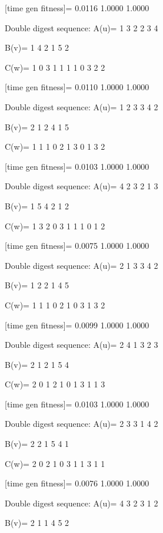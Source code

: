 [time gen fitness]=
    0.0116    1.0000    1.0000

Double digest sequence:
A(u)=
     1     3     2     2     3     4

B(v)=
     1     4     2     1     5     2

C(w)=
     1     0     3     1     1     1     1     0     3     2     2

[time gen fitness]=
    0.0110    1.0000    1.0000

Double digest sequence:
A(u)=
     1     2     3     3     4     2

B(v)=
     2     1     2     4     1     5

C(w)=
     1     1     1     0     2     1     3     0     1     3     2

[time gen fitness]=
    0.0103    1.0000    1.0000

Double digest sequence:
A(u)=
     4     2     3     2     1     3

B(v)=
     1     5     4     2     1     2

C(w)=
     1     3     2     0     3     1     1     1     0     1     2

[time gen fitness]=
    0.0075    1.0000    1.0000

Double digest sequence:
A(u)=
     2     1     3     3     4     2

B(v)=
     1     2     2     1     4     5

C(w)=
     1     1     1     0     2     1     0     3     1     3     2

[time gen fitness]=
    0.0099    1.0000    1.0000

Double digest sequence:
A(u)=
     2     4     1     3     2     3

B(v)=
     2     1     2     1     5     4

C(w)=
     2     0     1     2     1     0     1     3     1     1     3

[time gen fitness]=
    0.0103    1.0000    1.0000

Double digest sequence:
A(u)=
     2     3     3     1     4     2

B(v)=
     2     2     1     5     4     1

C(w)=
     2     0     2     1     0     3     1     1     3     1     1

[time gen fitness]=
    0.0076    1.0000    1.0000

Double digest sequence:
A(u)=
     4     3     2     3     1     2

B(v)=
     2     1     1     4     5     2

